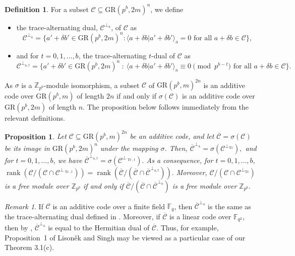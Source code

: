 \documentclass{article}
\DeclareMathOperator{\Tr}{Tr}
\DeclareMathOperator{\rank}{rank}
\newtheorem{prop}{Proposition}[section]
\theoremstyle{remark}
\newtheorem{rem}{Remark}[section]
\theoremstyle{definition}
\newtheorem{defin}{Definition}[section]
\numberwithin{equation}{section}
\begin{document}
\begin{defin} For a subset $\mathcal{C} \subseteq \text{GR}(p^b,2m)^{n}$, we define
\begin{itemize}
\item the trace-alternating dual, $\mathcal{C}^{\perp_{\mathrm{a}}}$, of $\mathcal{C}$ as
$$\mathcal{C}^{\perp_{\mathrm{a}}}=\{a'+\delta b' \in \text{GR}(p^b,2m)^{n}  : {\langle a+\delta b |  a'+\delta b' \rangle}_{\mathrm{a}} = 0 \text{~for all~}  a+\delta b \in \mathcal{C}\},$$
\item and for $t = 0,1,\ldots,b$, the trace-alternating $t$-dual of $\mathcal{C}$ as 
$$\mathcal{C}^{\perp_{\mathrm{a},t}} = \{a'+\delta b'  \in \text{GR}(p^b,2m)^{n} ~:~ {\langle a+\delta b |  a'+\delta b' \rangle}_{\mathrm{a}}  \equiv 0 \!\!\! \pmod{p^{b-t}} \text{~for all~}  a+\delta b  \in \mathcal{C}\}.$$
\end{itemize}
\end{defin}

As  $\sigma$ is a $\mathbb{Z}_{p^b}$-module isomorphism, a subset $\mathcal{C}$ of $\text{GR}(p^b,m)^{2n}$ is an additive code over $\text{GR}(p^b,m)$  of length $2n$ if and only if 
$\sigma{(\mathcal{C})}$ is an additive code over $\text{GR}(p^b,2m)$  of length $n.$
The proposition below follows immediately from the relevant definitions.

 \begin{prop}\label{prop:equiv} Let $\mathcal{C}\subseteq \text{GR}(p^b,m)^{2n}$ be an additive code, and let $\overline{\mathcal{C}} = \sigma(\mathcal{C})$ be its image in $\text{GR}(p^b,2m)^n$ under the mapping $\sigma$. 
Then, $\overline{\mathcal{C}}^{\perp_{\mathrm{a}}} = \sigma(\mathcal{C}^{\perp_{\Tr}}),$ and for $t = 0,1,\ldots,b$, we have $\overline{\mathcal{C}}^{\perp_{\mathrm{a},t}} = \sigma(\mathcal{C}^{\perp_{\Tr,t}}).$ As a consequence, for $t = 0,1,\ldots,b$,  $\rank(\mathcal{C}/(\mathcal{C} \cap \mathcal{C}^{\perp_{\Tr,t}}))=\rank(\overline{\mathcal{C}}/(\overline{\mathcal{C}} \cap \overline{\mathcal{C}}^{\perp_{\mathrm{a},t}})).$ Moreover, $\mathcal{C}/(\mathcal{C} \cap \mathcal{C}^{\perp_{\Tr}}) $ is a free module over $\mathbb{Z}_{p^b}$ if and only if $\overline{\mathcal{C}}/(\overline{\mathcal{C}} \cap \overline{\mathcal{C}}^{\perp_{\mathrm{a}}})$  is a free module over $\mathbb{Z}_{p^b}.$ 
\end{prop}

\begin{rem}\label{rem:field} If $\mathcal{C}$ is an additive code over a finite field $\mathbb{F}_q$, then $\overline{\mathcal{C}}^{\perp_{\mathrm{a}}}$ is the same as the trace-alternating dual defined in \cite[Section IV-B]{ketkar}. Moreover, if  $\overline{\mathcal{C}}$ is a linear code over $\mathbb{F}_{q^2}$, then by \cite[Lemma 18]{ketkar},   $\overline{\mathcal{C}}^{\perp_{\mathrm{a}}}$ is equal to the Hermitian dual of $\overline{\mathcal{C}}$. Thus, for example, Proposition~1 of Lison\v{e}k and Singh \cite{liso} may be viewed as a particular case of our Theorem 3.1(c).
\end{rem}
\end{document}
